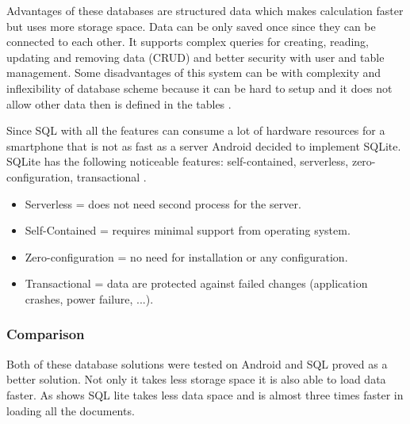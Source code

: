 Advantages of these databases are structured data which makes calculation faster but uses more storage space. Data can be only saved once since they can be connected to each other. It supports complex queries for creating, reading, updating and removing data (CRUD) and better security with user and table management. Some disadvantages of this system can be with complexity and inflexibility of database scheme because it can be hard to setup and it does not allow other data then is defined in the tables \cite{ERDMS}.

Since SQL with all the features can consume a lot of hardware resources for a smartphone that is not as fast as a server Android decided to implement SQLite. SQLite has the following noticeable features: self-contained, serverless, zero-configuration, transactional \cite{WISQLITE}.

\begin{itemize}
	\item Serverless = does not need second process for the server.
	\item Self-Contained = requires minimal support from operating system.
	\item Zero-configuration = no need for installation or any configuration.
	\item Transactional = data are protected against failed changes (application crashes, power failure, ...).
\end{itemize}

\subsubsection{Comparison}\label{subsec:Comparison}
Both of these database solutions were tested on Android and SQL proved as a better solution. Not only it takes less storage space it is also able to load data faster. As  shows SQL lite takes less data space and is almost three times faster in loading all the documents.

\begin{table}[h]
	\begin{center}
		\caption{Couchbase vs SQLite (sources: \cite{LGWSP, LGWST, HW2, PM600, AZW3})}
		\label{tab2}
	\end{center}
\end{table}

